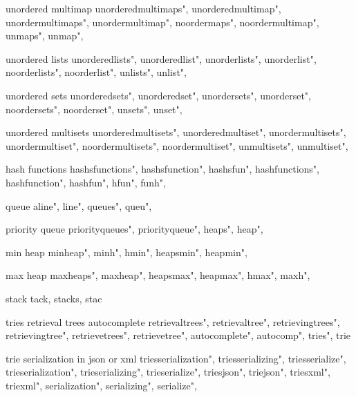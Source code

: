          unordered multimap 
        unorderedmultimaps", 
        unorderedmultimap", 
        unordermultimaps", 
        unordermultimap", 
        noordermaps", 
        noordermultimap", 
        unmaps", 
        unmap", 
        
         unordered lists 
        unorderedlists", 
        unorderedlist", 
        unorderlists", 
        unorderlist", 
        noorderlists", 
        noorderlist", 
        unlists", 
        unlist", 
        
         unordered sets
        unorderedsets", 
        unorderedset", 
        unordersets", 
        unorderset", 
        noordersets", 
        noorderset", 
        unsets", 
        unset", 
        
         unordered multisets
        unorderedmultisets", 
        unorderedmultiset", 
        unordermultisets", 
        unordermultiset", 
        noordermultisets", 
        noordermultiset", 
        unmultisets", 
        unmultiset", 
        
         hash functions
        hashsfunctions",  
        hashsfunction",  
        hashsfun",  
        hashfunctions",  
        hashfunction",  
        hashfun",  
        hfun",  
        funh",  
        
         queue 
        aline",
        line",
        queues",
        queu",
        
         priority queue 
        priorityqueues",  
        priorityqueue",  
        heaps",  
        heap",  
        
         min heap 
        minheap", 
        minh", 
        hmin",
        heapsmin",
        heapmin",
        
         max heap
        maxheaps",
        maxheap", 
        heapsmax",
        heapmax", 
        hmax",
        maxh",
        
         stack
        tack, stacks, stac
        
         tries retrieval trees autocomplete 
        retrievaltrees",  
        retrievaltree",  
        retrievingtrees",  
        retrievingtree",  
        retrievetrees",  
        retrievetree",  
        autocomplete",  
        autocomp",  
        tries",  
        trie
        
         trie serialization in json or xml 
        triesserialization",  
        triesserializing",  
        triesserialize",  
        trieserialization",  
        trieserializing",  
        trieserialize",  
        triesjson",  
        triejson",  
        triesxml",  
        triexml",  
        serialization",  
        serializing",  
        serialize",  
        
